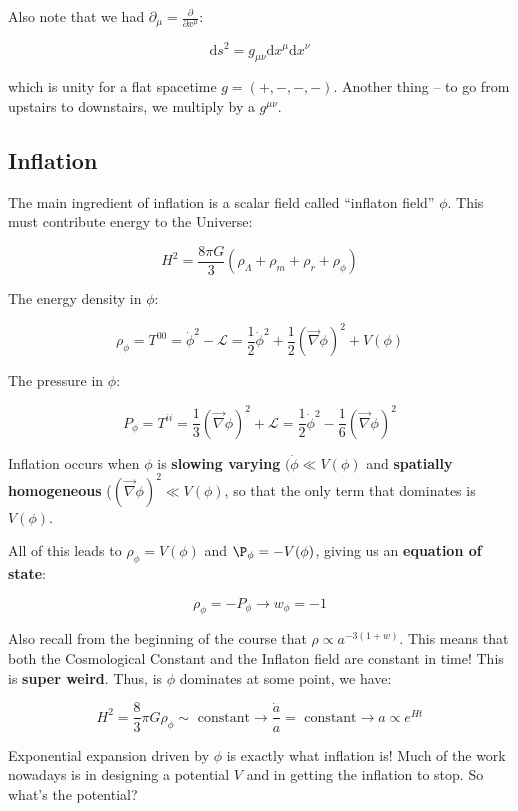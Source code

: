 \documentclass{article}
\newcommand{\be}{\begin{equation}}
\newcommand{\ee}{\end{equation}}
\begin{document}
Also note that we had $\partial_\mu = \frac{\partial}{\partial x^\mu}$:

\be
\mathrm{d}s^2 = g_{\mu\nu} \mathrm{d}x^\mu \mathrm{d}x^\nu
\ee

which is unity for a flat spacetime  $g = \left(+,-,-,-\right)$. Another thing -- to go from upstairs to downstairs, we multiply by a $g^{\mu\nu}$. 

\subsection{Inflation}

The main ingredient of inflation is a scalar field called ``inflaton field'' $\phi$. This must contribute energy to the Universe:

\be
H^2 = \frac{8\pi G}{3}\left(\rho_\Lambda + \rho_m + \rho_r + \rho_\phi\right)
\ee

The energy density in $\phi$:

\be
\rho_\phi = T^{00} = \dot{\phi}^2 - \mathcal{L} = \frac12 \dot{\phi}^2 + \frac12 \left(\vec{\nabla} \phi\right)^2 + V(\phi)
\ee

The pressure in $\phi$:

\be
P_\phi = T^{ii} = \frac13 \left(\vec{\nabla} \phi\right)^2 + \mathcal{L} = \frac12 \dot{\phi}^2 - \frac16 \left(\vec{\nabla}\phi\right)^2
\ee

Inflation occurs when $\phi$ is \textbf{slowing varying} $(\dot{\phi} \ll V(\phi)$ and \textbf{spatially homogeneous} ($\left(\vec{\nabla} \phi\right)^2 \ll V(\phi)$, so that the only term that dominates is $V(\phi)$.

All of this leads to $\rho_\phi = V(\phi)$ and $\P_\phi = - V(\phi)$, giving us an \textbf{equation of state}:

\be
\rho_\phi = -P_\phi \rightarrow \boxed{w_\phi = -1}
\ee

Also recall from the beginning of the course that $\rho \propto a^{-3(1+w)}$. This means that both the Cosmological Constant and the Inflaton field are constant in time! This is \textbf{super weird}. Thus, is $\phi$ dominates at some point, we have:

\be
H^2 = \frac83 \pi G \rho_\phi \sim \text{ constant} \rightarrow \frac{\dot{a}}{a} = \text{ constant} \rightarrow \boxed{a \propto e^{Ht}}
\ee

Exponential expansion driven by $\phi$ is exactly what inflation is! Much of the work nowadays is in designing a potential $V$ and in getting the inflation to stop. So what's the potential?
\end{document}

